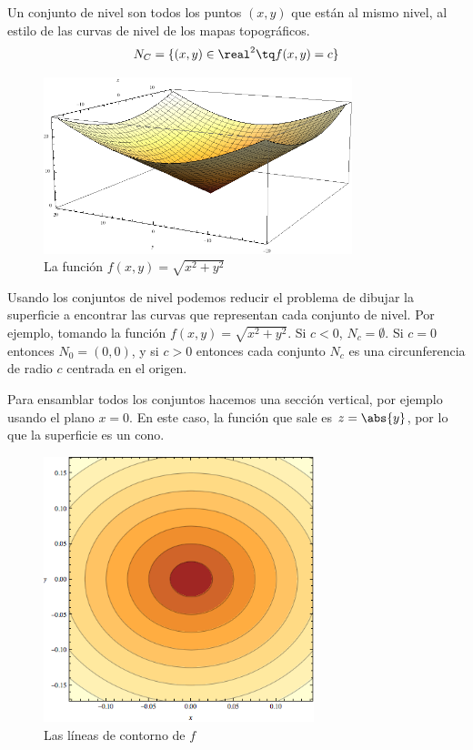\documentclass[nochap]{apuntes}
\begin{document}
\begin{defn} Un conjunto de nivel son todos los puntos $(x,y)$ que están al mismo nivel, al estilo de las curvas de nivel de los mapas topográficos.
\[ N_C=\{ (x,y) \in \real^2 \tq f(x,y) = c \} \]
\end{defn}

\begin{figure}[hbtp]    
	\begin{center} 
		\includegraphics[width=0.8\textwidth]{img/Cono.png}  
		\caption{La función $f(x,y) = \sqrt{x^2+y^2}$} 
	\end{center}  
\end{figure}

Usando los conjuntos de nivel podemos reducir el problema de dibujar la superficie a encontrar las curvas que representan cada conjunto de nivel. Por ejemplo, tomando la función $f(x,y) = \sqrt{x^2+y^2}$. Si $c<0$, $N_c = \emptyset$. Si $c = 0$ entonces $N_0 = (0,0)$, y si $c>0$ entonces cada conjunto $N_c$ es una circunferencia de radio $c$ centrada en el origen.

Para ensamblar todos los conjuntos hacemos una sección vertical, por ejemplo usando el plano $x=0$. En este caso, la función que sale es $z=\abs{y}$, por lo que la superficie es un cono.

\begin{figure}[hbtp]    
	\begin{center} 
		\includegraphics[width=0.7\textwidth]{img/ConoContorno.png} 
		\caption{Las líneas de contorno de $f$} 
	\end{center}  
\end{figure}
\end{document}
